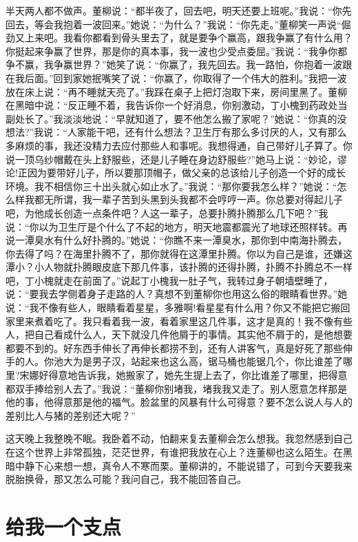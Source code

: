 \documentclass[12pt,oneside]{book}
\begin{document}
半天两人都不做声。董柳说：``都半夜了，回去吧，明天还要上班呢。''我说：``你先回去，等会我抱着一波回来。''她说：``为什么？''我说：``你先走。''董柳笑一声说``倔劲又上来吧。我看你都看到骨头里去了，就是要争个赢高，跟我争赢了有什么用？你挺起来争赢了世界，那是你的真本事，我一波也少受点委屈。''我说：``我争你都争不赢，我争赢世界？''她笑了说：``你赢了，我先回去。我一路怕，你抱着一波跟在我后面。''回到家她抿嘴笑了说：``你赢了，你取得了一个伟大的胜利。''我把一波放在床上说：``再不睡就天亮了。''我踩在桌子上把灯泡取下来，房间里黑了。董柳在黑暗中说：``反正睡不着，我告诉你一个好消息，你别激动，丁小槐到药政处当副处长了。''我淡淡地说：``早就知道了，要不他怎么搬了家呢？''她说：``你真的没想法?''我说：``人家能干吧，还有什么想法？卫生厅有那么多讨厌的人，又有那么多麻烦的事，我还没精力去应付那些人和事呢。我想得通，自己带好儿子算了。你说一顶乌纱帽戴在头上舒服些，还是儿子睡在身边舒服些?''她马上说：``妙论，谬论!正因为要带好儿子，所以要那顶帽子，做父亲的总该给儿子创造一个好的成长环境。我不相信你三十出头就心如止水了。''我说：``那你要我怎么样？''她说：``怎么样我都无所谓，我一辈子苦到头黑到头我都不会哼哼一声。你总要对得起儿子吧，为他成长创造一点条件吧？人这一辈子，总要扑腾扑腾那么几下吧？''我说：``你以为卫生厅是个什么了不起的地方，明天地震都震光了地球还照样转。再说一潭臭水有什么好扑腾的。''她说：``你瞧不来一潭臭水，那你到中南海扑腾去，你去得了吗？在海里扑腾不了，那你就得在这潭里扑腾。你以为自己是谁，还嫌这潭小？小人物就扑腾眼皮底下那几件事，该扑腾的还得扑腾，扑腾不扑腾总不一样吧，丁小槐就走在前面了。''说起丁小槐我一肚子气，我转过身子朝墙壁睡了，说：``要我去学侧着身子走路的人？真想不到董柳你也用这么俗的眼睛看世界。''她说：``我不像有些人，眼睛看着星星，多雅啊!看星星有什么用？你又不能把它搬回家里来煮着吃了。我只看着我一波，看着家里这几件事，这才是真的！我不像有些人，把自己看成什么人，天下就没几件他屑于的事情。其实他不屑于的，是他想要都要不到的。好东西手伸长了再伸长都捞不到，还有人讲客气，真是好死了那些伸手的人。你池大为是男子汉，站起来也这么高，锯马桶也能锯几个，你比谁差了哪里?宋娜好得意地告诉我，她搬家了，她先生提上去了，你比谁差了哪里，把得意都双手捧给别人去了。''我说：``董柳你别堵我，堵我我又走了。别人愿意怎样那是他的事，他得意那是他的福气。脸盆里的风暴有什么可得意？要不怎么说人与人的差别比人与猪的差别还大呢？''

这天晚上我整晚不眠。我卧着不动，怕翻来复去董柳会怎么想我。我忽然感到自己在这个世界上非常孤独，茫茫世界，有谁把我放在心上？连董柳也这么陌生。在黑暗中静下心来想一想，真令人不寒而栗。董柳讲的，不能说错了，可到今天要我来脱胎换骨，那又怎么可能？我问自己，我不能回答自己。


\chapter{给我一个支点}
\end{document}
